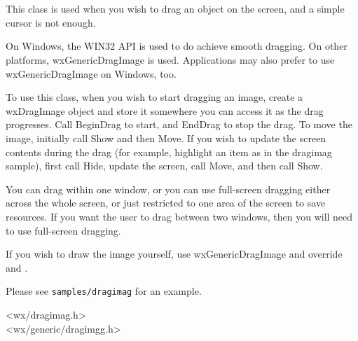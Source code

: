 \section{}\label{wxdragimage}

This class is used when you wish to drag an object on the screen,
and a simple cursor is not enough.

On Windows, the WIN32 API is used to do achieve smooth dragging. On other platforms,
wxGenericDragImage is used. Applications may also prefer to use
wxGenericDragImage on Windows, too.


To use this class, when you wish to start dragging an image, create a wxDragImage
object and store it somewhere you can access it as the drag progresses.
Call BeginDrag to start, and EndDrag to stop the drag. To move the image,
initially call Show and then Move. If you wish to update the screen contents
during the drag (for example, highlight an item as in the dragimag sample), first call Hide,
update the screen, call Move, and then call Show.

You can drag within one window, or you can use full-screen dragging
either across the whole screen, or just restricted to one area
of the screen to save resources. If you want the user to drag between
two windows, then you will need to use full-screen dragging.

If you wish to draw the image yourself, use wxGenericDragImage and
override  and 
.

Please see {\tt samples/dragimag} for an example.

%




<wx/dragimag.h>\\
<wx/generic/dragimgg.h>


